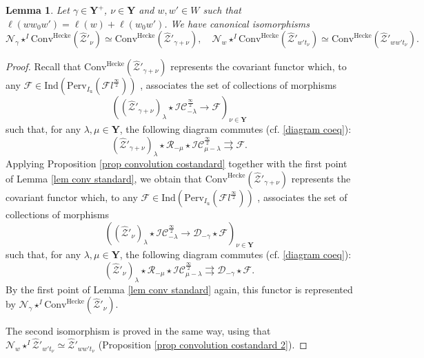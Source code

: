 \documentclass[11pt]{amsart}
\theoremstyle{plain}
\newtheorem{lem}[thm]{Lemma}
\theoremstyle{remark}
\numberwithin{equation}{section}
\begin{document}
\begin{lem}\label{lem commute convo}
    Let $\gamma\in\mathbf{Y}^+$, $\nu\in\mathbf{Y}$ and  $w,w'\in W$ such that $\ell(ww_0w')=\ell(w)+\ell(w_0w')$. We have canonical isomorphisms
    $$ \mathcal{N}_\gamma\star^I\mathrm{Conv}^{\mathrm{Hecke}}(\widehat{\mathcal{Z}}'_\nu)\simeq \mathrm{Conv}^{\mathrm{Hecke}}(\widehat{\mathcal{Z}}'_{\gamma+\nu}),\quad\mathcal{N}_w\star^I\mathrm{Conv}^{\mathrm{Hecke}}(\widehat{\mathcal{Z}}'_{w't_\nu})\simeq \mathrm{Conv}^{\mathrm{Hecke}}(\widehat{\mathcal{Z}}'_{ww't_\nu}).$$
\end{lem}
\begin{proof}
   Recall that  $\mathrm{Conv}^{\mathrm{Hecke}}(\widehat{\mathcal{Z}}'_{\gamma+\nu})$ represents the covariant functor which, to any $\mathcal{F}\in \mathrm{Ind}(\mathrm{Perv}_{{I_\mathrm{u}}}(\mathcal{F}l^{\frac{\infty}{2}}))$ , associates the set of collections of morphisms $$((\widehat{\mathcal{Z}}'_{\gamma+\nu})_\lambda\star\mathcal{IC}^{\frac{\infty}{2}}_{-\lambda}\to \mathcal{F})_{\nu\in\mathbf{Y}}$$ such that, for any $\lambda,\mu\in\mathbf{Y}$, the following diagram commutes (cf. \eqref{diagram coeq}):
	\begin{equation*}
		(\widehat{\mathcal{Z}}'_{\gamma+\nu})_\lambda\star\mathcal{R}_{-\mu}\star\mathcal{IC}^{\frac{\infty}{2}}_{\mu-\lambda}\rightrightarrows\mathcal{F}. 
	\end{equation*} 
 Applying Proposition \ref{prop convolution costandard} together with the first point of Lemma \ref{lem conv standard}, we obtain that $\mathrm{Conv}^{\mathrm{Hecke}}(\widehat{\mathcal{Z}}'_{\gamma+\nu})$ represents the covariant functor which, to any $\mathcal{F}\in \mathrm{Ind}(\mathrm{Perv}_{{I_\mathrm{u}}}(\mathcal{F}l^{\frac{\infty}{2}}))$ , associates the set of collections of morphisms $$((\widehat{\mathcal{Z}}'_{\nu})_\lambda\star\mathcal{IC}^{\frac{\infty}{2}}_{-\lambda}\to \mathcal{D}_{-\gamma}\star\mathcal{F})_{\nu\in\mathbf{Y}}$$ such that, for any $\lambda,\mu\in\mathbf{Y}$, the following diagram commutes (cf. \eqref{diagram coeq}):
	\begin{equation*}
		(\widehat{\mathcal{Z}}'_{\nu})_\lambda\star\mathcal{R}_{-\mu}\star\mathcal{IC}^{\frac{\infty}{2}}_{\mu-\lambda}\rightrightarrows\mathcal{D}_{-\gamma}\star\mathcal{F}. 
	\end{equation*} 
 By the first point of Lemma \ref{lem conv standard} again, this functor is represented by $ \mathcal{N}_\gamma\star^I\mathrm{Conv}^{\mathrm{Hecke}}(\widehat{\mathcal{Z}}'_\nu)$.

  The second isomorphism is proved in the same way, using that $\mathcal{N}_w\star^I\widehat{\mathcal{Z}}'_{w't_\nu}\simeq \widehat{\mathcal{Z}}'_{ww't_\nu}$ (Proposition \ref{prop convolution costandard 2}). 
\end{proof}
\end{document}
